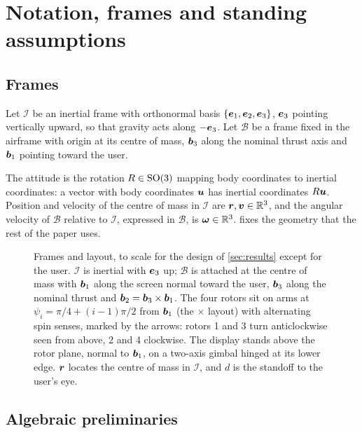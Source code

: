 ﻿\section{Notation, frames and standing assumptions}
\label{sec:notation}

\subsection{Frames}

Let $\mathcal{I}$ be an inertial frame with orthonormal basis
$\{\bm{e}_1,\bm{e}_2,\bm{e}_3\}$, $\bm{e}_3$ pointing vertically
upward, so that gravity acts along $-\bm{e}_3$. Let $\mathcal{B}$ be a frame
fixed in the airframe with origin at its centre of mass, $\bm{b}_3$ along the
nominal thrust axis and $\bm{b}_1$ pointing toward the user.

The attitude is the rotation $R \in \mathrm{SO}(3)$ mapping body coordinates to
inertial coordinates: a vector with body coordinates $\bm{u}$ has inertial
coordinates $R\bm{u}$. Position and velocity of the centre of mass in
$\mathcal{I}$ are $\bm{r},\bm{v}\in\mathbb{R}^3$, and the angular velocity of
$\mathcal{B}$ relative to $\mathcal{I}$, expressed in $\mathcal{B}$, is
$\bm{\omega}\in\mathbb{R}^3$.  fixes the geometry that the rest of
the paper uses.

\begin{figure}[tbp]
\centering

\caption{Frames and layout, to scale for the design of \cref{sec:results}
except for the user. $\mathcal I$ is inertial with $\bm{e}_3$ up;
$\mathcal B$ is attached at the centre of mass with $\bm{b}_1$ along the screen
normal toward the user, $\bm{b}_3$ along the nominal thrust and
$\bm{b}_2 = \bm{b}_3\times\bm{b}_1$. The four rotors sit on arms at
$\psi_i = \pi/4 + (i-1)\pi/2$ from $\bm{b}_1$ (the $\times$ layout) with
alternating spin senses, marked by the arrows: rotors 1 and 3 turn
anticlockwise seen from above, 2 and 4 clockwise. The display stands above the
rotor plane, normal to $\bm{b}_1$, on a two-axis gimbal hinged at its lower
edge. $\bm{r}$ locates the centre of mass in $\mathcal I$, and $d$ is the
standoff to the user's eye.}
\label{fig:frames}
\end{figure}

\subsection{Algebraic preliminaries}

